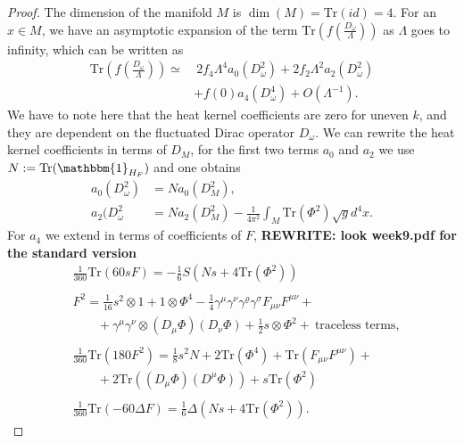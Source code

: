 \begin{proof}
     The dimension of the manifold $M$ is $\dim(M) = \text{Tr}(id) =4$. For
     an $x \in M$, we have an asymptotic expansion of the term
     $\text{Tr}(f(\frac{D_\omega}{\Lambda}))$ as $\Lambda$ goes to infinity,
     which can be written as
     \begin{align}
         \text{Tr}(f(\frac{D_\omega}{\Lambda})) \simeq& \ 2f_4 \Lambda ^4
         a_0(D_\omega ^2)+ 2f_2\Lambda^2 a_2(D_\omega^2)\nonumber \\&+ f(0) a_4(D_\omega^4)
         +O(\Lambda^{-1}).\label{eq:trheatkernel}
     \end{align}
     We have to note here that the heat kernel coefficients are zero for uneven $k$,
     and they are dependent on the fluctuated Dirac operator
     $D_\omega$. We can rewrite the heat kernel coefficients in terms of $D_M$,
     for the first two terms $a_0$ and $a_2$ we use $N:=
     \text{Tr}(\mathbbm{1}_{H_F})$ and one obtains
     \begin{align}
         a_0(D_\omega^2) &= Na_0(D_M^2),\\
         a_2(D_\omega^2 &= Na_2(D_M^2) - \frac{1}{4\pi^2}\int_M
         \text{Tr}(\Phi^2)\sqrt{g}d^4x.
     \end{align}
     For $a_4$ we extend in terms of coefficients of $F$, \textbf{REWRITE: look week9.pdf
     for the standard version}
     \begin{align}
         &\frac{1}{360}\text{Tr}(60sF)= -\frac{1}{6}S(Ns + 4
         \text{Tr}(\Phi^2))\\
        \nonumber\\
         &F^2 = \frac{1}{16}s^2\otimes 1 + 1\otimes \Phi^4 - \frac{1}{4}
         \gamma^\mu\gamma^\nu \gamma^\varrho\gamma^\sigma F_{\mu\nu}F^{\mu\nu}+\\
         &\;\;\;\;\;\;\;+\gamma^\mu\gamma^\nu\otimes(D_\mu\Phi)(D_\nu
         \Phi)+\frac{1}{2}s\otimes \Phi^2 + \ \text{traceless terms},\\
         \nonumber\\
         &\frac{1}{360}\text{Tr}(180F^2) = \frac{1}{8}s^2N + 2\text{Tr}(\Phi^4)
         + \text{Tr}(F_{\mu\nu}F^{\mu\nu}) +\\
         &\;\;\;\;\;\;\;+2\text{Tr}((D_\mu\Phi)(D^\mu\Phi))
         + s\text{Tr}(\Phi^2)\\
         \nonumber\\
         &\frac{1}{360}\text{Tr}(-60\Delta F)=
         \frac{1}{6}\Delta(Ns+4\text{Tr}(\Phi^2)).
     \end{align}

\end{proof}
